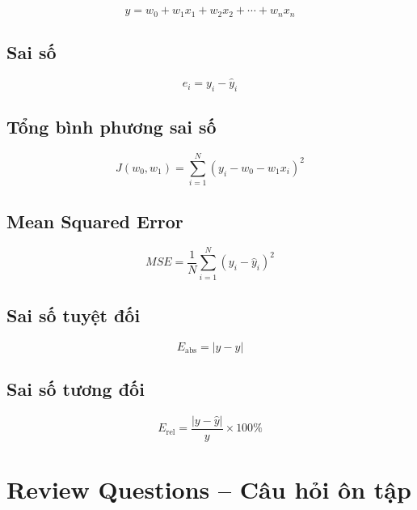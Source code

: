\[
    \hat{y}
    =
    w_0
    +
    w_1x_1
    +
    w_2x_2
    +
    \cdots
    +
    w_nx_n
\]

\subsection*{Sai số}

\[
    e_i=y_i-\hat{y}_i
\]

\subsection*{Tổng bình phương sai số}

\[
    J(w_0,w_1)
    =
    \sum_{i=1}^{N}
    \left(
    y_i-w_0-w_1x_i
    \right)^2
\]

\subsection*{Mean Squared Error}

\[
    MSE
    =
    \frac{1}{N}
    \sum_{i=1}^{N}
    \left(
    y_i-\hat{y}_i
    \right)^2
\]

\subsection*{Sai số tuyệt đối}

\[
    E_{\text{abs}}
    =
    |y-\hat{y}|
\]

\subsection*{Sai số tương đối}

\[
    E_{\text{rel}}
    =
    \frac{|y-\hat{y}|}{y}\times100\%
\]

\section{Review Questions -- Câu hỏi ôn tập}

